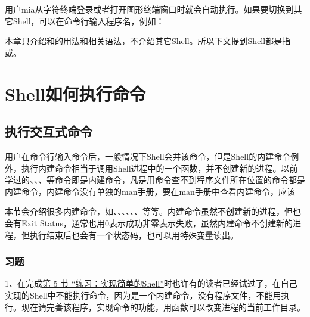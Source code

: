 

用户mia从字符终端登录或者打开图形终端窗口时就会自动执行。如果要切换到其它Shell，可以在命令行输入程序名，例如：




本章只介绍和的用法和相关语法，不介绍其它Shell。所以下文提到Shell都是指或。




\section{Shell如何执行命令}
%
\subsection{执行交互式命令}
%


用户在命令行输入命令后，一般情况下Shell会并该命令，但是Shell的内建命令例外，执行内建命令相当于调用Shell进程中的一个函数，并不创建新的进程。以前学过的、、、等命令即是内建命令，凡是用命令查不到程序文件所在位置的命令都是内建命令，内建命令没有单独的man手册，要在man手册中查看内建命令，应该




本节会介绍很多内建命令，如、、、、\BookCode{[\BookSplit{}}、、等等。内建命令虽然不创建新的进程，但也会有Exit Status，通常也用0表示成功非零表示失败，虽然内建命令不创建新的进程，但执行结束后也会有一个状态码，也可以用特殊变量读出。


\subsubsection*{习题}
%


1、在完成\hyperlink{db.ch30s05.id2868354}{第 5 节 “练习：实现简单的Shell”}时也许有的读者已经试过了，在自己实现的Shell中不能执行命令，因为是一个内建命令，没有程序文件，不能用执行。现在请完善该程序，实现命令的功能，用函数可以改变进程的当前工作目录。



